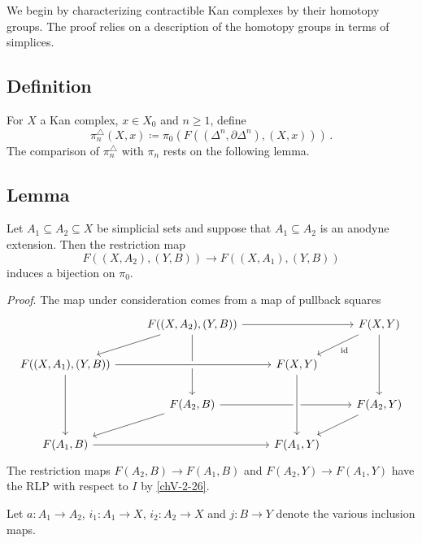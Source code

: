         We begin by characterizing contractible Kan complexes by their homotopy groups. The proof relies on a description of the homotopy groups in terms of simplices.

    \subsection{Definition}\label{chV-3-12}
        For $X$ a Kan complex, $x \in X_0$ and $n \geq 1$, define
        \begin{equation*}
            \pi^{\triangle}_n(X, x) \coloneq \pi_0(F((\Delta^n, \partial \Delta^n),(X, x))) \,.
        \end{equation*}
        The comparison of $\pi^{\triangle}_n$ with $\pi_n$ rests on the following lemma.

    \subsection{Lemma}\label{chV-3-13}
        Let $A_1 \subseteq A_2 \subseteq X$ be simplicial sets and suppose that $A_1 \subseteq A_2$ is an anodyne extension. Then the restriction map
        \begin{equation*}
            F((X, A_2),(Y, B)) \to F((X, A_1),(Y, B))
        \end{equation*}
        induces a bijection on $\pi_0$.
        \smallskip

        \emph{Proof}. The map under consideration comes from a map of pullback squares
        \begin{equation*}
            \begin{tikzcd}
                & F((X, A_2),(Y, B)) \arrow[ld] \arrow[dd] \arrow[rr] & & F(X, Y) \arrow[ld, "\id"] \arrow[dd] \\
                F((X, A_1),(Y, B)) \arrow[dd] \arrow[rr, crossing over] & & F(X, Y) & \\
                & F(A_2, B) \arrow[ld] \arrow[rr] & & F(A_2, Y) \arrow[ld] \\
                F(A_1, B) \arrow[rr] & & F(A_1, Y) \arrow[from=uu, crossing over] &
            \end{tikzcd}
        \end{equation*}
        The restriction maps $F(A_2, B) \to F(A_1, B)$ and $F(A_2, Y) \to F(A_1, Y)$ have the RLP with respect to $I$ by \ref{chV-2-26}.

        Let $a \colon A_1 \to A_2$, $i_1 \colon A_1 \to X$, $i_2 \colon A_2 \to X$ and $j \colon B \to Y$ denote the various inclusion maps.

